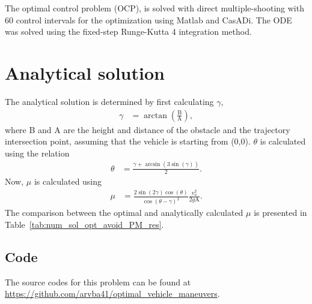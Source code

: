 The optimal control problem (OCP), is solved with direct multiple-shooting with 60 control intervals for the optimization using Matlab and CasADi. The ODE was solved using the fixed-step Runge-Kutta 4 integration method. 

\section{Analytical solution}
The analytical solution is determined by first calculating $\gamma$, 
\begin{align}
    \gamma &= \arctan\left(\frac{\text{B}}{\text{A}}\right),
\end{align}
where B and A are the height and distance of the obstacle and the trajectory intersection point, assuming that the vehicle is starting from (0,0). 
$\theta$ is calculated using the relation
\begin{align}
    \theta &= \frac{\gamma + \arcsin\left(3\sin\left(\gamma\right)\right)}{2}.
\end{align}
Now, $\mu$ is calculated using 
\begin{align}
    \mu &= \frac{2\sin\left(2\gamma\right)\cos\left(\theta\right)}{\cos\left(\theta-\gamma\right)^2}\frac{v_o^2}{2g\text{A}}.
\end{align}
The comparison between the optimal and analytically calculated $\mu$ is presented in Table~\ref{tab:num_sol_opt_avoid_PM_res}.

\subsection{Code}
The source codes for this problem can be found at \newline \href{https://github.com/arvba41/optimal_vehicle_maneuvers/blob/main/uppgift/ugf4/opti_veh_men_prt.m}{https://github.com/arvba41/optimal\_vehicle\_maneuvers}.

